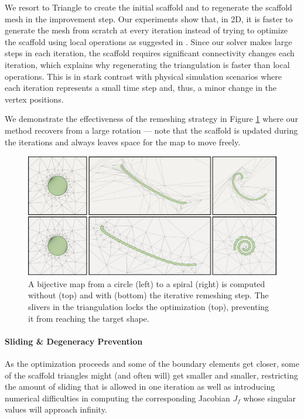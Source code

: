 We resort to Triangle \cite{Shewchuk:1996} to create the initial scaffold and to regenerate the scaffold mesh in the improvement step. Our experiments show that, in 2D, it is faster to generate the mesh from scratch at every iteration instead of trying to optimize the scaffold using local operations as suggested in \cite{Muller:2015}. Since our solver makes large steps in each iteration, the scaffold requires significant connectivity changes each iteration, which explains why regenerating the triangulation is faster than local operations. This is in stark contrast with physical simulation scenarios where each iteration represents a small time step and, thus, a minor change in the vertex positions.

We demonstrate the effectiveness of the remeshing strategy in Figure \ref{scaf:fig:recovering} where our method recovers from a large rotation --- note that the scaffold is updated during the iterations and always leaves space for the map to move freely.

\begin{figure}[h]
\includegraphics[width=\columnwidth]{scaf-tex/figs/coil-remeshing}
\caption{
\label{scaf:fig:recovering}
A bijective map from a circle (left) to a spiral (right) is computed without (top) and with (bottom) the iterative remeshing step. The slivers in the triangulation locks the optimization (top), preventing it from reaching the target shape.
}
\end{figure}
\paragraph{Sliding {\& Degeneracy Prevention}}
As the optimization proceeds and some of the boundary elements get closer, some of the scaffold triangles might (and often will) get smaller and smaller, restricting the amount of sliding that is allowed in one iteration as well as introducing numerical difficulties in computing the corresponding Jacobian $J_f$ {whose singular values will approach infinity.}

